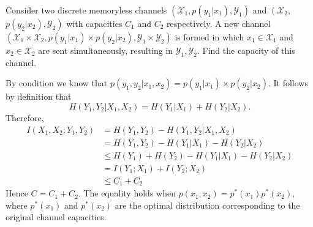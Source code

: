 \begin{exercise}{Consider two discrete memoryless channels $\left(\mathcal{X}_{1}, p\left(y_{1} | x_{1}\right), \mathcal{Y}_{1}\right)$ and $\left(\mathcal{X}_{2}, \right.$  $\left. p\left(y_{2} | x_{2}\right), \mathcal{Y}_{2}\right)$ with capacities $C_{1}$ and $C_{2}$ respectively. A new channel $\left(\mathcal{X}_{1} \times \mathcal{X}_{2}, p\left(y_{1} | x_{1}\right) \times p\left(y_{2} | x_{2}\right), \mathcal{Y}_{1} \times \mathcal{Y}_{2}\right)$ is formed in which $x_{1} \in \mathcal{X}_{1}$ and $x_{2} \in \mathcal{X}_{2}$ are sent simultaneously, resulting in $\mathcal{Y}_{1}, \mathcal{Y}_{2} .$ Find the capacity of this channel.}
  \begin{solution} By condition we know that $p(y_1,y_2|x_1,x_2) = p\left(y_{1} | x_{1}\right) \times p\left(y_{2} | x_{2}\right)$. It follows by definition that 
    \begin{equation}
      H(Y_1,Y_2|X_1,X_2) = H(Y_1|X_1)+H(Y_2|X_2).
    \end{equation}
    Therefore, 
    \begin{equation}
      \begin{aligned}
        I(X_1,X_2;Y_1,Y_2) &= H(Y_1,Y_2) - H(Y_1,Y_2|X_1,X_2) \\
        &= H(Y_1,Y_2) - H(Y_1|X_1) - H(Y_2|X_2) \\
        &\le H(Y_1) + H(Y_2) - H(Y_1|X_1) - H(Y_2|X_2) \\
        &= I(Y_1;X_1) + I(Y_2;X_2) \\
        &\le C_1 + C_2
      \end{aligned}
    \end{equation}
    Hence $C = C_1 +C_2$. The equality holds when $p(x_1,x_2) = p^{*}(x_1) p^{*}(x_2)$, where $p^{*}(x_1)$ and $p^{*}(x_2)$ are the optimal distribution corresponding to the original channel capacities.
  \end{solution}
  \label{ex6-3}
\end{exercise}

